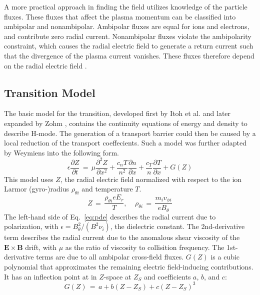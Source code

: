 \documentclass[a4paper]{article}
\begin{document}
A more practical approach in finding the field utilizes knowledge of the particle fluxes.
These fluxes that affect the plasma momentum can be classified into ambipolar and nonambipolar.
Ambipolar fluxes are equal for ions and electrons, and contribute zero radial current.
Nonambipolar fluxes violate the ambipolarity constraint, which causes the radial electric field to generate a return current such that the divergence of the plasma current vanishes.
These fluxes therefore depend on the radial electric field \cite{callen_toroidal_2009}.

\subsection{Transition Model}
The basic model for the transition, developed first by Itoh et al. \cite{itoh_edge_1991} and later expanded by Zohm \cite{zohm_dynamic_1994}, contains the continuity equations of energy and density to describe H-mode.
The generation of a transport barrier could then be caused by a local reduction of the transport coeffecients.
Such a model was further adapted by Weymiens \cite{weymiens_bifurcation_2014} into the following form.
\begin{equation}
	\epsilon \frac{\partial Z}{\partial t} \,=\, \mu \frac{\partial^2 Z}{\partial x^2} + \frac{c_n T}{n^2} \frac{\partial n}{\partial x} + \frac{c_T}{n} \frac{\partial T}{\partial x} + G(Z)
	\label{eq:pde}
\end{equation}
This model uses $Z$, the radial electric field normalized with respect to the ion Larmor (gyro-)radius $\rho_{\theta i}$ and temperature $T$.
\begin{equation}
	Z \,=\, \frac{\rho_{\theta i} e E_r}{T}, ~~~~~ \rho_{\theta i} \,=\, \frac{m_i v_{\phi i}}{e B_\theta}
	\label{eq:normalization}
\end{equation}
The left-hand side of Eq.~\ref{eq:pde} describes the radial current due to polarization, with $\epsilon = B_\theta^2 / (B^2 \nu_i)$, the dielectric constant.
The 2nd-derivative term describes the radial current due to the anomalous shear viscosity of the $\mathbf{E}\times\mathbf{B}$ drift, with $\mu$ as the ratio of viscosity to collisition frequency.
The 1st-derivative terms are due to all ambipolar cross-field fluxes.
$G(Z)$ is a cubic polynomial that approximates the remaining electric field-inducing contributions.
It has an inflection point at in $Z$-space at $Z_S$ and coefficients $a$, $b$, and $c$:
\begin{equation}
	G(Z) \,=\, a + b(Z - Z_S) + c(Z - Z_S)^3
\end{equation}
\end{document}
